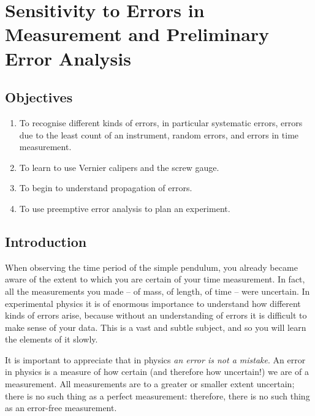 
\chapter{Sensitivity to Errors in Measurement and Preliminary Error Analysis}
\section{Objectives}

\begin{enumerate}
    \item To recognise different kinds of errors, in particular systematic errors, errors due to the least count of an instrument, random errors, and errors in time measurement.
    \item To learn to use Vernier calipers and the screw gauge.
    \item To begin to understand propagation of errors. 
    \item To use preemptive error analysis to plan an experiment. 
    
\end{enumerate}

\section{Introduction}

When observing the time period of the simple pendulum, you already became aware of the extent to which you are certain of your time measurement. In fact, all the measurements you made -- of mass, of length, of time -- were uncertain. In experimental physics it is of enormous importance to understand how different kinds of errors arise, because without an understanding of errors it is difficult to make sense of your data. This is a vast and subtle subject, and so you will learn the elements of it slowly.

It is important to appreciate that in physics \textit{an error is not a mistake}. An error in physics is a measure of how certain (and therefore how uncertain!) we are of a measurement. All measurements are to a greater or smaller extent uncertain; there is no such thing as a perfect measurement: therefore, there is no such thing as an error-free measurement. 


